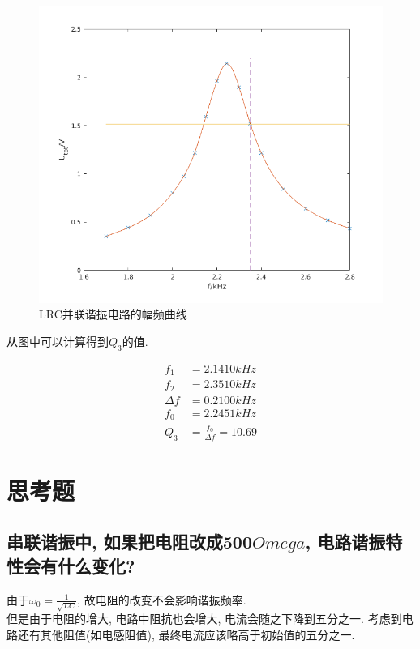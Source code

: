 \documentclass[a4paper,12pt,notitlepage]{article}
\begin{document}
\begin{figure}[H]
\centering
	\includegraphics[scale=0.6]{exp14_4.png}
	\caption{LRC并联谐振电路的幅频曲线}
\end{figure}
	
	从图中可以计算得到$Q_3$的值.	
	
\begin{align*}
	f_1 &= 2.1410 kHz \\
	f_2 &= 2.3510 kHz \\
	\Delta f &= 0.2100 kHz \\
	f_0 &= 2.2451 kHz \\
	Q_3 &= \frac{f_0}{\Delta f} = 10.69
\end{align*}

\section{思考题}

\subsection{串联谐振中, 如果把电阻改成500$Omega$, 电路谐振特性会有什么变化?}

	由于$\omega_0 = \frac{1}{\sqrt{LC}}$, 故电阻的改变不会影响谐振频率. \\
	
	但是由于电阻的增大, 电路中阻抗也会增大, 电流会随之下降到五分之一. 考虑到电路还有其他阻值(如电感阻值), 最终电流应该略高于初始值的五分之一. \\
	
\end{document}
